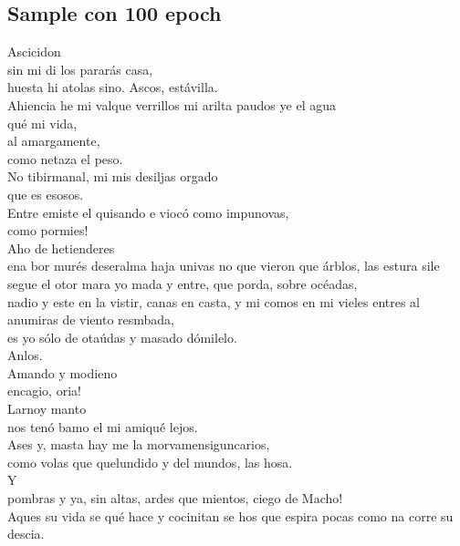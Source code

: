 \documentclass[11pt,letterpaper]{article}
\begin{document}
\subsection{Sample con 100 epoch}
\begin{center}
\parbox{0.5\linewidth} {
Ascicidon\\
sin mi di los pararás casa,\\
huesta hi atolas sino. Ascos, estávilla.\\

Ahiencia he mi valque verrillos mi arilta paudos ye el agua\\
qué mi vida,\\
al amargamente,\\
como netaza el peso.\\
No tibirmanal, mi mis desiljas orgado\\
que es esosos.\\

Entre emiste el quisando e viocó como impunovas,\\
como pormies!\\
Aho de hetienderes\\
ena bor murés deseralma haja univas no que vieron que árblos, las estura sile segue el otor mara yo mada y entre, que porda, sobre océadas,\\
nadio y este en la vistir, canas en casta, y mi comos en mi vieles entres al anumiras de viento resmbada,\\
es yo sólo de otaúdas y masado dómilelo.\\

Anlos.\\
Amando y modieno\\
encagio, oria!\\
Larnoy manto\\
nos tenó bamo el mi amiqué lejos.\\
Ases y, masta hay me la morvamensiguncarios,\\
como volas que quelundido y del mundos, las hosa.\\
Y\\
pombras y ya, sin altas, ardes que mientos, ciego de Macho!\\
Aques su vida se qué hace y cocinitan se hos que espira pocas como na corre su descia.\\
}
\end{center}
\end{document}
